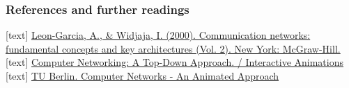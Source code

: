 \begin{frame}
	\frametitle{References and further readings}
	
	\begin{thebibliography}{9}
		
		  \href{https://www.ibr.cs.tu-bs.de/courses/ws0809/pcn/Documents/Communication_Networks-Fundamentals_Concepts_and_Key_Architectures.pdf}{Leon-Garcia, A., \& Widjaja, I. (2000). Communication networks: fundamental concepts and key architectures (Vol. 2). New York: McGraw-Hill.}
		  \href{https://wps.pearsoned.com/ecs_kurose_compnetw_6/216/55463/14198702.cw/index.html}{Computer Networking: A Top-Down Approach. / Interactive Animations }
		  \href{https://www2.tkn.tu-berlin.de/teaching/rn/animations/}{TU Berlin. Computer Networks - An Animated Approach }
		

		
	
	
	\end{thebibliography}

\end{frame}